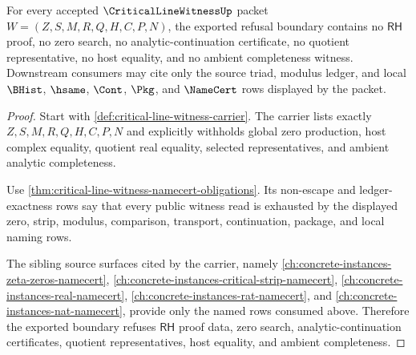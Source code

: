 \begin{theorem}
\label{thm:critical-line-witness-root-unblock-refusal-boundary}
For every accepted $\CriticalLineWitnessUp$ packet $W=(Z,S,M,R,Q,H,C,P,N)$, the exported refusal boundary contains no $\mathsf{RH}$ proof, no zero search, no analytic-continuation certificate, no quotient representative, no host equality, and no ambient completeness witness. Downstream consumers may cite only the source triad, modulus ledger, and local $\BHist$, $\hsame$, $\Cont$, $\Pkg$, and $\NameCert$ rows displayed by the packet.
\end{theorem}
\begin{proof}
Start with \autoref{def:critical-line-witness-carrier}. The carrier lists exactly $Z,S,M,R,Q,H,C,P,N$ and explicitly withholds global zero production, host complex equality, quotient real equality, selected representatives, and ambient analytic completeness.

Use \autoref{thm:critical-line-witness-namecert-obligations}. Its non-escape and ledger-exactness rows say that every public witness read is exhausted by the displayed zero, strip, modulus, comparison, transport, continuation, package, and local naming rows.

The sibling source surfaces cited by the carrier, namely \autoref{ch:concrete-instances-zeta-zeros-namecert}, \autoref{ch:concrete-instances-critical-strip-namecert}, \autoref{ch:concrete-instances-real-namecert}, \autoref{ch:concrete-instances-rat-namecert}, and \autoref{ch:concrete-instances-nat-namecert}, provide only the named rows consumed above. Therefore the exported boundary refuses $\mathsf{RH}$ proof data, zero search, analytic-continuation certificates, quotient representatives, host equality, and ambient completeness.
\end{proof}

